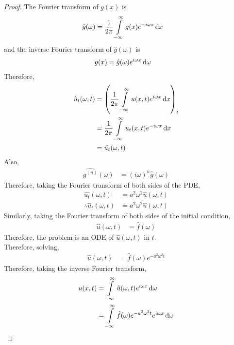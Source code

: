 \documentclass[titlepage, fleqn, a4paper, 12pt, twoside]{article}
\theoremstyle{definition}
\theoremstyle{theorem}
\begin{document}
\begin{proof}
	The Fourier transform of $g(x)$ is
	\begin{align*}
		\hat{g}(\omega) & = \frac{1}{2 \pi} \int\limits_{-\infty}^{\infty} g(x) e^{-i \omega x} \dif x
	\end{align*}
	and the inverse Fourier transform of $\hat{g}(\omega)$ is
	\begin{align*}
		g(x) & = \hat{g}(\omega) e^{i \omega x} \dif \omega
	\end{align*}
	Therefore,
	\begin{align*}
		\hat{u}_t(\omega,t) & = \left( \frac{1}{2 \pi} \int\limits_{-\infty}^{\infty} u(x,t) e^{i \omega x} \dif x \right)_t \\
                                    & = \frac{1}{2 \pi} \int\limits_{-\infty}^{\infty} u_t(x,t) e^{-i \omega x} \dif x               \\
                                    & = \hat{u_t}(\omega,t)
	\end{align*}
	Also,
	\begin{align*}
		\hat{g^{(n)}}(\omega) & = (i \omega)^n \hat{g}(\omega)
	\end{align*}
	Therefore, taking the Fourier transform of both sides of the PDE,
	\begin{align*}
		\hat{u_t}(\omega,t)            & = a^2 \omega^2 \hat{u}(\omega,t) \\
		\therefore \hat{u}_t(\omega,t) & = a^2 \omega^2 \hat{u}(\omega,t)
	\end{align*}
	Similarly, taking the Fourier transform of both sides of the initial condition,
	\begin{align*}
		\hat{u}(\omega,t) & = \hat{f}(\omega)
	\end{align*}
	Therefore, the problem is an ODE of $\hat{u}(\omega,t)$ in $t$.\\
	Therefore, solving,
	\begin{align*}
		\hat{u}(\omega,t) & = \hat{f}(\omega) e^{-a^2 \omega^2 t}
	\end{align*}
	Therefore, taking the inverse Fourier transform,
	\begin{align*}
		u(x,t) & = \int\limits_{-\infty}^{\infty} \hat{u}(\omega,t) e^{i \omega x} \dif \omega                                                                                             \\
                       & = \int\limits_{-\infty}^{\infty} \hat{f}(\omega) e^{-a^2 \omega^2 t} e^{i \omega x} \dif \omega                                                                           \\

\end{align*}
\end{proof}
\end{document}

